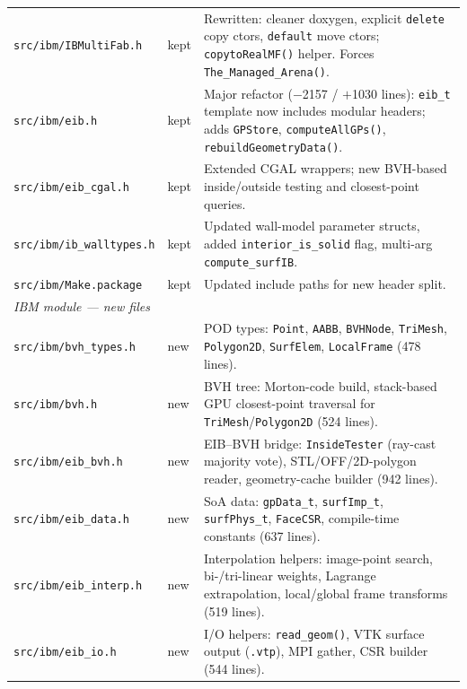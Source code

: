 \documentclass[11pt,a4paper]{article}
\begin{document}
\begin{longtable}{p{4.2cm} p{1.2cm} p{8.5cm}}
\texttt{src/ibm/IBMultiFab.h}
  & \color{kept}kept
  & Rewritten: cleaner doxygen, explicit \texttt{delete} copy ctors,
    \texttt{default} move ctors; \texttt{copytoRealMF()} helper.
    Forces \texttt{The\_Managed\_Arena()}. \\

\texttt{src/ibm/eib.h}
  & \color{kept}kept
  & Major refactor ($-$2157 / $+$1030 lines): \texttt{eib\_t} template
    now includes modular headers; adds \texttt{GPStore},
    \texttt{computeAllGPs()}, \texttt{rebuildGeometryData()}. \\

\texttt{src/ibm/eib\_cgal.h}
  & \color{kept}kept
  & Extended CGAL wrappers; new BVH-based inside/outside testing and
    closest-point queries. \\

\texttt{src/ibm/ib\_walltypes.h}
  & \color{kept}kept
  & Updated wall-model parameter structs, added
    \texttt{interior\_is\_solid} flag, multi-arg
    \texttt{compute\_surfIB}. \\

\texttt{src/ibm/Make.package}
  & \color{kept}kept
  & Updated include paths for new header split. \\

\midrule
\multicolumn{3}{l}{\textit{IBM module --- new files}} \\
\midrule

\texttt{src/ibm/bvh\_types.h}
  & \color{newfile}new
  & POD types: \texttt{Point}, \texttt{AABB}, \texttt{BVHNode},
    \texttt{TriMesh}, \texttt{Polygon2D}, \texttt{SurfElem},
    \texttt{LocalFrame} (478 lines). \\

\texttt{src/ibm/bvh.h}
  & \color{newfile}new
  & BVH tree: Morton-code build, stack-based GPU closest-point
    traversal for \texttt{TriMesh}/\texttt{Polygon2D} (524 lines). \\

\texttt{src/ibm/eib\_bvh.h}
  & \color{newfile}new
  & EIB--BVH bridge: \texttt{InsideTester} (ray-cast majority vote),
    STL/OFF/2D-polygon reader, geometry-cache builder (942 lines). \\

\texttt{src/ibm/eib\_data.h}
  & \color{newfile}new
  & SoA data: \texttt{gpData\_t}, \texttt{surfImp\_t},
    \texttt{surfPhys\_t}, \texttt{FaceCSR}, compile-time constants
    (637 lines). \\

\texttt{src/ibm/eib\_interp.h}
  & \color{newfile}new
  & Interpolation helpers: image-point search, bi-/tri-linear weights,
    Lagrange extrapolation, local/global frame transforms (519 lines). \\

\texttt{src/ibm/eib\_io.h}
  & \color{newfile}new
  & I/O helpers: \texttt{read\_geom()}, VTK surface output
    (\texttt{.vtp}), MPI gather, CSR builder (544 lines). \\

\bottomrule
\end{longtable}
\end{document}
